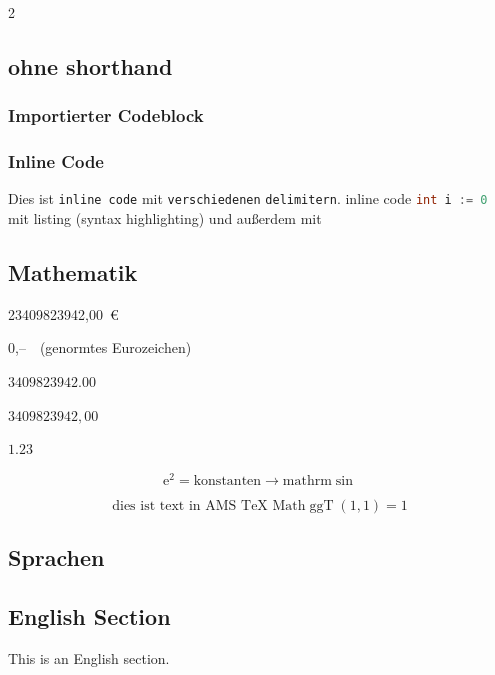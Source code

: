 \begin{multicols}{2}

\subsection{ohne shorthand}

\subsubsection{Importierter Codeblock}


\subsubsection{Inline Code}

Dies ist \verb`inline code` mit \verb|verschiedenen| \verb+delimitern+.
inline code \lstinline[language=go]`int i := 0` mit listing (syntax highlighting)
und außerdem mit 

\subsection{Mathematik}

23409823942,00~€

0,--~\officialeuro \ (genormtes Eurozeichen)

$3409823942.00$

$3409823942{,}00$

$\num{1,23}$

\[
	\mathrm{e}^2 = \mathrm{konstanten \rightarrow mathrm} \sin
\]

$$ \text{dies ist text in AMS TeX Math} \operatorname{ggT}(1, 1) = 1 $$

\subsection{Sprachen}

\blindtext

\begin{otherlanguage}{english}
\subsection{English Section}
This is an English section.
\tableofcontents
\end{otherlanguage}

\end{multicols}

